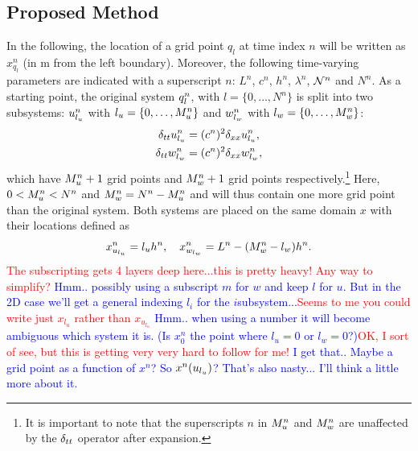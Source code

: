 \documentclass[fleqn]{jaes}
\def\SBcomment[#1]{\textcolor{red}{#1}}
\def\SWcomment[#1]{\textcolor{blue}{#1}}
\begin{document}
\subsection{Proposed Method}
In the following, the location of a grid point $q_l$ at time index $n$ will be written as $x_{q_l}^n$ (in m from the left boundary). Moreover, the following time-varying parameters are indicated with a superscript $n$: $L^n$, $c^n$, $h^n$, $\lambda^n$, $\mathcal{N}^n$ and $N^n$. %
As a starting point, the original system $q_l^n$, with $l=\{0, \hdots, N^n\}$ is split into two subsystems: $u_{l_u}^n$ with $l_u=\{0, \hdots, M_u^n\}$ and $w_{l_w}^n$ with  $l_w=\{0, \hdots, M_w^n\}$:
\begin{subequations}\label{eq:splitFDS}
    \begin{align}
        \delta_{tt} u_{l_u}^n &= (c^n)^2\delta_{xx} u_{l_u}^n,\\
        \delta_{tt} w_{l_w}^n &= (c^n)^2\delta_{xx} w_{l_w}^n,
    \end{align}
\end{subequations}
which have $M_u^n+1$ grid points and $M_w^n+1$ grid points respectively.\footnote{It is important to note that the superscripts $n$ in $M_u^n$ and $M_w^n$ are unaffected by the $\delta_{tt}$ operator after expansion.} Here, $0<M_u^n<N^n$ and $M_w^n = N^n - M_u^n$ and will thus contain one more grid point than the original system. Both systems are placed on the same domain $x$ with their locations defined as
\begin{equation}\label{eq:gridLocations}
    x_{u_\lu}^n =\lu h^n, \quad x_{w_\lw}^n = L^n-(\Mw-\lw)h^n.
\end{equation}
\SBcomment[The subscripting gets 4 layers deep here...this is pretty heavy! Any way to simplify?] \SWcomment[Hmm.. possibly using a subscript $m$ for $w$ and keep $l$ for $u$. But in the 2D case we'll get a general indexing $l_i$ for the $i$\th subsystem...]\SBcomment[Seems to me you could write just $x_{l_{u}}$ rather than $x_{u_{l_{u}}}$] \SWcomment[Hmm.. when using a number it will become ambiguous which system it is. (Is $x_0^n$ the point where $l_u = 0$ or $l_w = 0$?)]\SBcomment[OK, I sort of see, but this is getting very very hard to follow for me!] \SWcomment[I get that.. Maybe a grid point as a function of $x^n$? So $x^n(u_{l_u})$? That's also nasty... I'll think a little more about it.]
\end{document}
